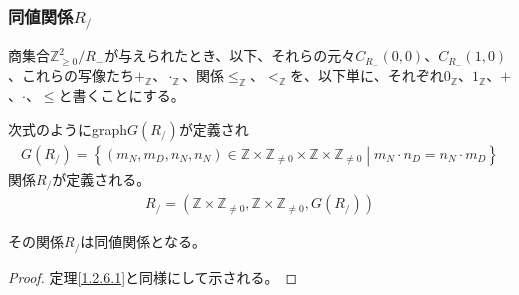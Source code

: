 \documentclass[dvipdfmx]{jsarticle}
\begin{document}
\subsubsection{同値関係$R_{/}$}%
\begin{dfn}
商集合$\mathbb{Z}_{\geq 0}^{2} /R_{-} $が与えられたとき、以下、それらの元々$C_{R_{-}}(0,0)$、$C_{R_{-}}(1,0)$、これらの写像たち$+_{\mathbb{Z}}$、$\cdot_{\mathbb{Z}}$、関係$\leq_{\mathbb{Z}}$、$<_{\mathbb{Z}}$を、以下単に、それぞれ$0_{\mathbb{Z}}$、$1_{\mathbb{Z}}$、$+$、$\cdot$、$\leq$と書くことにする。
\end{dfn}
\begin{dfn}
次式のようにgraph$G\left( R_{/} \right)$が定義され
\begin{align*}
G\left( R_{/} \right) = \left\{ \left( m_{N},m_{D},n_{N},n_{N} \right) \in \mathbb{Z} \times \mathbb{Z}_{\neq 0} \times \mathbb{Z} \times \mathbb{Z}_{\neq 0} \middle| m_{N} \cdot n_{D} = n_{N} \cdot m_{D} \right\}
\end{align*}
関係$R_{/}$が定義される。
\begin{align*}
R_{/} = \left( \mathbb{Z} \times \mathbb{Z}_{\neq 0},\mathbb{Z} \times \mathbb{Z}_{\neq 0},G\left( R_{/} \right) \right)
\end{align*}
\end{dfn}
\begin{thm}\label{1.2.6.10}
その関係$R_{/}$は同値関係となる。
\end{thm}
\begin{proof}
定理\ref{1.2.6.1}と同様にして示される。
\end{proof}
\end{document}
